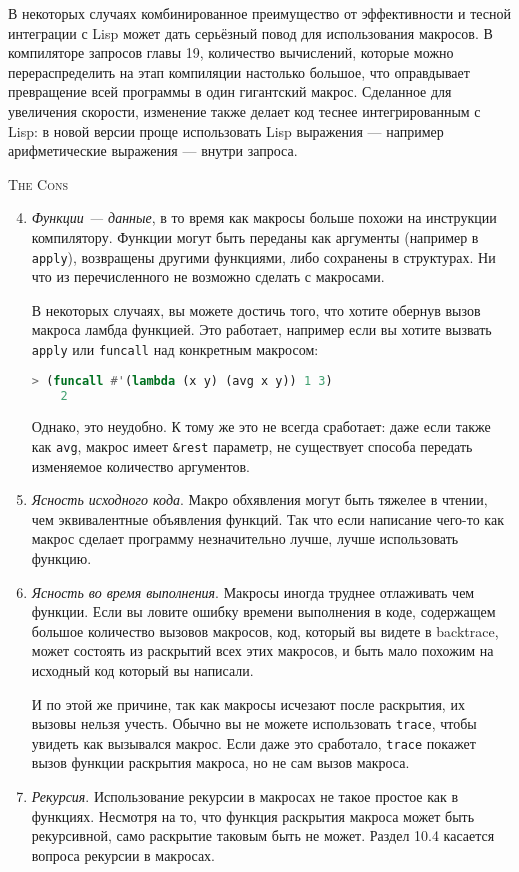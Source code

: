 \documentclass[12pt, a4paper]{article} %
\begin{document}
В некоторых случаях комбинированное преимущество от эффективности и тесной интеграции с Lisp может дать серьёзный повод для использования макросов. В компиляторе запросов главы 19,  количество вычислений, которые можно перераспределить на этап компиляции настолько большое, что оправдывает превращение всей программы в один гигантский макрос. Сделанное для увеличения скорости, изменение также делает код теснее интегрированным с Lisp: в новой версии проще использовать Lisp выражения --- например арифметические выражения --- внутри запроса.

\begin{center}
    \textsc{The Cons}
\end{center}

\begin{enumerate} \setcounter{enumi}{3}
    \item \textit{Функции --- данные}, в то время как макросы больше похожи на инструкции компилятору. Функции могут быть переданы как аргументы (например в \texttt{apply}), возвращены другими функциями, либо сохранены в структурах. Ни что из перечисленного не возможно сделать с макросами. 

    В некоторых случаях, вы можете достичь того, что хотите обернув вызов макроса ламбда функцией. Это работает, например если вы хотите вызвать \texttt{apply} или \texttt{funcall} над конкретным макросом:
\begin{lstlisting}[language=Lisp]
    > (funcall #'(lambda (x y) (avg x y)) 1 3)
    2
\end{lstlisting}
    Однако, это неудобно. К тому же это не всегда сработает: даже если также как \texttt{avg}, макрос имеет \texttt{\&rest} параметр, не существует способа передать изменяемое количество аргументов.

    \item \textit{Ясность исходного кода}. Макро обхявления могут быть тяжелее в чтении, чем эквивалентные объявления функций. Так что если написание чего-то как макрос сделает программу незначительно лучше, лучше использовать функцию.

    \item \textit{Ясность во время выполнения}. Макросы иногда труднее отлаживать чем функции. Если вы ловите ошибку времени выполнения в коде, содержащем большое количество вызовов макросов, код, который вы видете в backtrace, может состоять из раскрытий всех этих макросов, и быть мало похожим на исходный код который вы написали.

    И по этой же причине, так как макросы исчезают после раскрытия, их вызовы нельзя учесть. Обычно вы не можете использовать \texttt{trace}, чтобы увидеть как вызывался макрос. Если даже это сработало, \texttt{trace} покажет вызов функции раскрытия макроса, но не сам вызов макроса.

    \item \textit{Рекурсия}. Использование рекурсии в макросах не такое простое как в функциях. Несмотря на то, что функция раскрытия макроса может быть рекурсивной, само раскрытие таковым быть не может. Раздел 10.4 касается вопроса рекурсии в макросах.
\end{enumerate}
\end{document}
